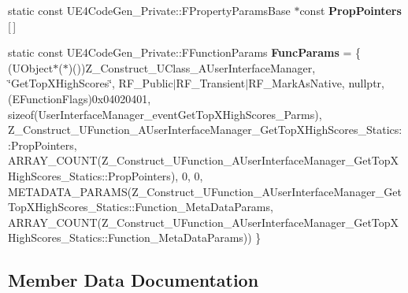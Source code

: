 \begin{DoxyCompactItemize}
\item 
static const U\+E4\+Code\+Gen\+\_\+\+Private\+::\+F\+Property\+Params\+Base $\ast$const {\bfseries Prop\+Pointers} \mbox{[}$\,$\mbox{]}
\item 
\mbox{\label{struct_z___construct___u_function___a_user_interface_manager___get_top_x_high_scores___statics_a0977c2bb1126cc5189f8c23204d3be8d}} 
static const U\+E4\+Code\+Gen\+\_\+\+Private\+::\+F\+Function\+Params {\bfseries Func\+Params} = \{ (U\+Object$\ast$($\ast$)())Z\+\_\+\+Construct\+\_\+\+U\+Class\+\_\+\+A\+User\+Interface\+Manager, \char`\"{}Get\+Top\+X\+High\+Scores\char`\"{}, R\+F\+\_\+\+Public$\vert$R\+F\+\_\+\+Transient$\vert$R\+F\+\_\+\+Mark\+As\+Native, nullptr, (E\+Function\+Flags)0x04020401, sizeof(\+User\+Interface\+Manager\+\_\+event\+Get\+Top\+X\+High\+Scores\+\_\+\+Parms), Z\+\_\+\+Construct\+\_\+\+U\+Function\+\_\+\+A\+User\+Interface\+Manager\+\_\+\+Get\+Top\+X\+High\+Scores\+\_\+\+Statics\+::\+Prop\+Pointers, A\+R\+R\+A\+Y\+\_\+\+C\+O\+U\+N\+T(\+Z\+\_\+\+Construct\+\_\+\+U\+Function\+\_\+\+A\+User\+Interface\+Manager\+\_\+\+Get\+Top\+X\+High\+Scores\+\_\+\+Statics\+::\+Prop\+Pointers), 0, 0, M\+E\+T\+A\+D\+A\+T\+A\+\_\+\+P\+A\+R\+A\+M\+S(\+Z\+\_\+\+Construct\+\_\+\+U\+Function\+\_\+\+A\+User\+Interface\+Manager\+\_\+\+Get\+Top\+X\+High\+Scores\+\_\+\+Statics\+::\+Function\+\_\+\+Meta\+Data\+Params, A\+R\+R\+A\+Y\+\_\+\+C\+O\+U\+N\+T(\+Z\+\_\+\+Construct\+\_\+\+U\+Function\+\_\+\+A\+User\+Interface\+Manager\+\_\+\+Get\+Top\+X\+High\+Scores\+\_\+\+Statics\+::\+Function\+\_\+\+Meta\+Data\+Params)) \}
\end{DoxyCompactItemize}


\subsection{Member Data Documentation}
\mbox{\label{struct_z___construct___u_function___a_user_interface_manager___get_top_x_high_scores___statics_a9320118862341d05aa89e62e3d49c3ae}} 
